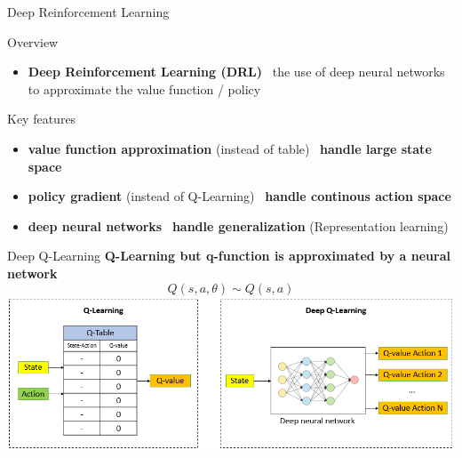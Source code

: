 \documentclass[presentation, 9pt]{beamer}\mode<presentation>{\usetheme{AMSBolognaFC}}
\begin{document}
\begin{frame}{Deep Reinforcement Learning}
	\centering
	\begin{block}{Overview}
		\begin{itemize}
			\item \textbf{Deep Reinforcement Learning (DRL)} \faArrowRight \, the use of deep neural networks to approximate the value function / policy
		\end{itemize}
	\end{block}
	
	\begin{alertblock}{Key features}
		\begin{itemize}
			\item \textbf{value function approximation} (instead of table) \faArrowRight \, \textbf{handle large state space}
			\item \textbf{policy gradient} (instead of Q-Learning) \faArrowRight \, \textbf{handle continous action space}
			\item \textbf{deep neural networks} \faArrowRight \, \textbf{handle generalization} (Representation learning)
		\end{itemize}
	\end{alertblock}
\end{frame}
\begin{frame}{Deep Q-Learning}
	\centering
	\textbf{Q-Learning but q-function is approximated by a neural network}
	$$ Q(s, a, \theta) \sim Q(s, a) $$
	\includegraphics[width=\textwidth]{img/dql-vs-ql-1.png}
\end{frame}
\end{document}
